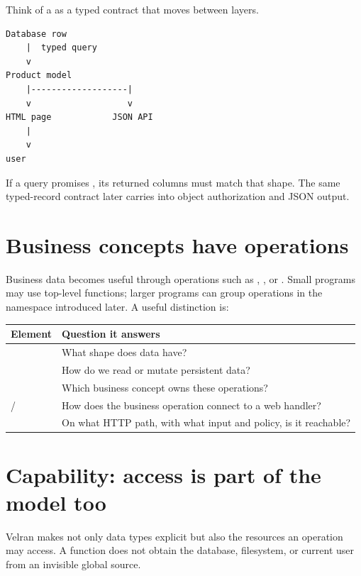 Think of a  as a typed contract that moves between layers.

\begin{lstlisting}
Database row
    |  typed query
    v
Product model
    |-------------------|
    v                   v
HTML page            JSON API
    |
    v
user
\end{lstlisting}

If a query promises , its returned columns must match that shape. The same typed-record contract later carries into object authorization and JSON output.

\section{Business concepts have operations}

Business data becomes useful through operations such as , , or . Small programs may use top-level functions; larger programs can group operations in the  namespace introduced later. A useful distinction is:

\begin{center}
\begin{tabularx}{\textwidth}{@{}lY@{}}
\toprule
Element & Question it answers \\
\midrule
{} & What shape does  data have? \\
 & How do we read or mutate persistent data? \\
 & Which business concept owns these operations? \\
/ & How does the business operation connect to a web handler? \\
 & On what HTTP path, with what input and policy, is it reachable? \\
\bottomrule
\end{tabularx}
\end{center}

\section{Capability: access is part of the model too}

Velran makes not only data types explicit but also the resources an operation may access. A function does not obtain the database, filesystem, or current user from an invisible global source.

